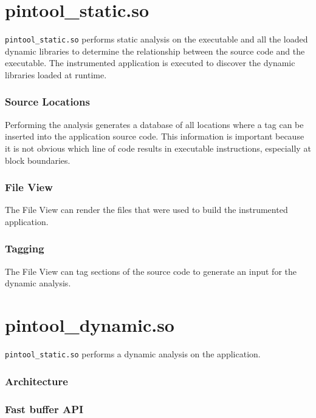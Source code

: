 \section{pintool\_static.so}
\label{cap3:pintoolstatic}

\texttt{pintool\_static.so} performs static analysis on the executable and all the loaded dynamic libraries to determine the relationship between the source code and the executable. The instrumented application is executed to discover the dynamic libraries loaded at runtime.

\subsubsection{Source Locations}

Performing the analysis generates a database of all locations where a tag can be inserted into the application source code. This information is important because it is not obvious which line of code results in executable instructions, especially at block boundaries.

\subsubsection{File View}

The File View can render the files that were used to build the instrumented application.

\subsubsection{Tagging}

The File View can tag sections of the source code to generate an input for the dynamic analysis. 

\section{pintool\_dynamic.so}
\label{cap3:pintooldynamic}

\texttt{pintool\_static.so} performs a dynamic analysis on the application.

\subsubsection{Architecture}



\subsubsection{Fast buffer API}
